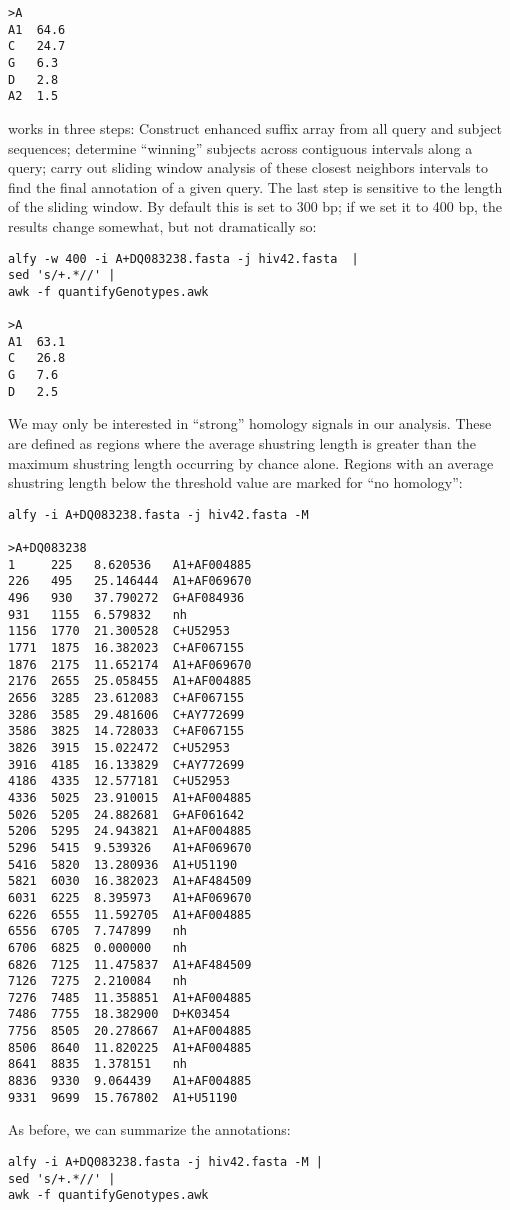 \documentclass[a4paper]{article}
\begin{document}
\begin{itemize}
\begin{verbatim}
>A
A1  64.6
C   24.7
G   6.3
D   2.8
A2  1.5
\end{verbatim}
\I {} works in three steps:
\be
\I Construct enhanced suffix array from all query and
subject sequences;
\I determine ``winning'' subjects across contiguous intervals
along a query;
\I carry out sliding window analysis of these closest neighbors intervals to
find the final annotation of a given query.
\ee
The last step is sensitive to the length of the sliding window. By
default this is set to 300 bp; if we set it to 400 bp, the results
change somewhat, but not dramatically so:
\begin{verbatim}
alfy -w 400 -i A+DQ083238.fasta -j hiv42.fasta  | 
sed 's/+.*//' | 
awk -f quantifyGenotypes.awk

>A
A1  63.1
C   26.8
G   7.6
D   2.5
\end{verbatim}
\I We may only be interested in ``strong'' homology signals in our
analysis. These are defined as regions where the average shustring
length is greater than the maximum shustring length occurring by chance
alone. Regions with an average shustring length below the threshold value are
marked   for ``no homology'':
\begin{verbatim}
alfy -i A+DQ083238.fasta -j hiv42.fasta -M

>A+DQ083238
1     225   8.620536   A1+AF004885
226   495   25.146444  A1+AF069670
496   930   37.790272  G+AF084936
931   1155  6.579832   nh
1156  1770  21.300528  C+U52953
1771  1875  16.382023  C+AF067155
1876  2175  11.652174  A1+AF069670
2176  2655  25.058455  A1+AF004885
2656  3285  23.612083  C+AF067155
3286  3585  29.481606  C+AY772699
3586  3825  14.728033  C+AF067155
3826  3915  15.022472  C+U52953
3916  4185  16.133829  C+AY772699
4186  4335  12.577181  C+U52953
4336  5025  23.910015  A1+AF004885
5026  5205  24.882681  G+AF061642
5206  5295  24.943821  A1+AF004885
5296  5415  9.539326   A1+AF069670
5416  5820  13.280936  A1+U51190
5821  6030  16.382023  A1+AF484509
6031  6225  8.395973   A1+AF069670
6226  6555  11.592705  A1+AF004885
6556  6705  7.747899   nh
6706  6825  0.000000   nh
6826  7125  11.475837  A1+AF484509
7126  7275  2.210084   nh
7276  7485  11.358851  A1+AF004885
7486  7755  18.382900  D+K03454
7756  8505  20.278667  A1+AF004885
8506  8640  11.820225  A1+AF004885
8641  8835  1.378151   nh
8836  9330  9.064439   A1+AF004885
9331  9699  15.767802  A1+U51190
\end{verbatim}
\I As before, we can summarize the annotations:
\begin{verbatim}
alfy -i A+DQ083238.fasta -j hiv42.fasta -M |
sed 's/+.*//' | 
awk -f quantifyGenotypes.awk


\end{verbatim}
\end{itemize}
\end{document}
